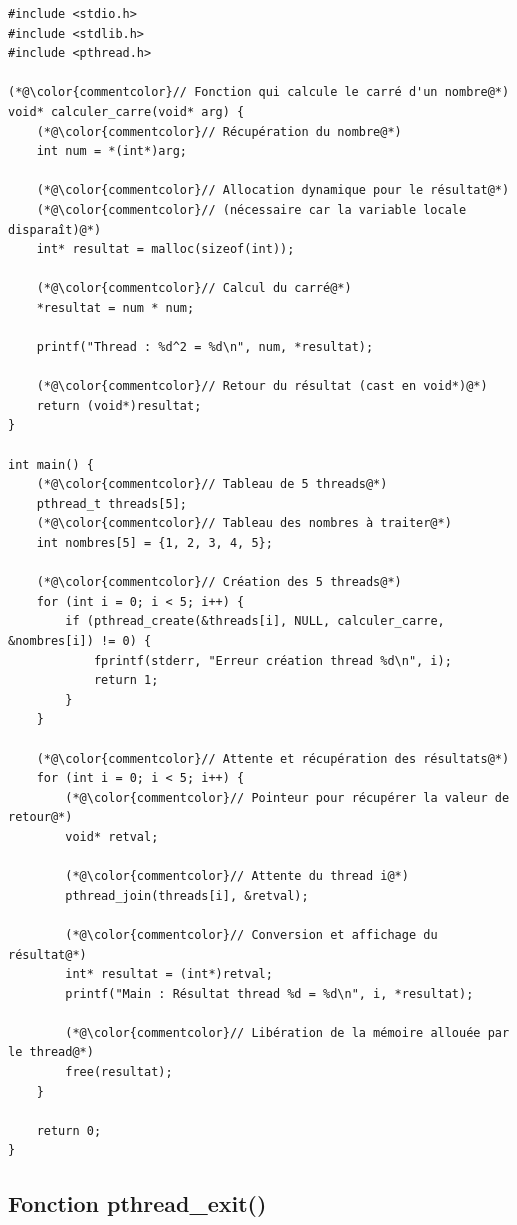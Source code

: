 \documentclass[11pt,a4paper]{article}
\begin{document}
\begin{lstlisting}[caption={Création de plusieurs threads avec retour de valeurs}]
#include <stdio.h>
#include <stdlib.h>
#include <pthread.h>

(*@\color{commentcolor}// Fonction qui calcule le carré d'un nombre@*)
void* calculer_carre(void* arg) {
    (*@\color{commentcolor}// Récupération du nombre@*)
    int num = *(int*)arg;
    
    (*@\color{commentcolor}// Allocation dynamique pour le résultat@*)
    (*@\color{commentcolor}// (nécessaire car la variable locale disparaît)@*)
    int* resultat = malloc(sizeof(int));
    
    (*@\color{commentcolor}// Calcul du carré@*)
    *resultat = num * num;
    
    printf("Thread : %d^2 = %d\n", num, *resultat);
    
    (*@\color{commentcolor}// Retour du résultat (cast en void*)@*)
    return (void*)resultat;
}

int main() {
    (*@\color{commentcolor}// Tableau de 5 threads@*)
    pthread_t threads[5];
    (*@\color{commentcolor}// Tableau des nombres à traiter@*)
    int nombres[5] = {1, 2, 3, 4, 5};
    
    (*@\color{commentcolor}// Création des 5 threads@*)
    for (int i = 0; i < 5; i++) {
        if (pthread_create(&threads[i], NULL, calculer_carre, &nombres[i]) != 0) {
            fprintf(stderr, "Erreur création thread %d\n", i);
            return 1;
        }
    }
    
    (*@\color{commentcolor}// Attente et récupération des résultats@*)
    for (int i = 0; i < 5; i++) {
        (*@\color{commentcolor}// Pointeur pour récupérer la valeur de retour@*)
        void* retval;
        
        (*@\color{commentcolor}// Attente du thread i@*)
        pthread_join(threads[i], &retval);
        
        (*@\color{commentcolor}// Conversion et affichage du résultat@*)
        int* resultat = (int*)retval;
        printf("Main : Résultat thread %d = %d\n", i, *resultat);
        
        (*@\color{commentcolor}// Libération de la mémoire allouée par le thread@*)
        free(resultat);
    }
    
    return 0;
}
\end{lstlisting}

\subsection{Fonction pthread\_exit()}
\end{document}
